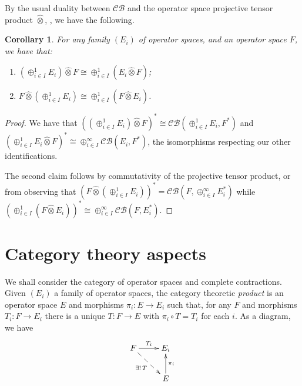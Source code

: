 \documentclass[a4paper,11pt]{article}
\theoremstyle{plain}
\newtheorem{corollary}[proposition]{Corollary}
\theoremstyle{definition}
\newcommand{\mc}[1]{\mathcal{#1}}
\newcommand{\proten}{\widehat\otimes}
\begin{document}
By the usual duality between $\mc{CB}$ and the operator space projective tensor product
$\proten$, \cite[Chapter~7]{er}, we have the following.

\begin{corollary}
For any family $(E_i)$ of operator spaces, and an operator space $F$, we have that:
\begin{enumerate}
\item $(\oplus_{i\in I}^1 E_i) \proten F \cong \oplus_{i\in I}^1 (E_i\proten F)$;
\item $F \proten (\oplus_{i\in I}^1 E_i) \cong \oplus_{i\in I}^1 (F\proten E_i)$.
\end{enumerate}
\end{corollary}
\begin{proof}
We have that $((\oplus_{i\in I}^1 E_i) \proten F)^* \cong \mc{CB}(\oplus_{i\in I}^1 E_i, F^*)$
and $(\oplus_{i\in I}^1 E_i\proten F)^* \cong \oplus_{i\in I}^\infty \mc{CB}(E_i,F^*)$,
the isomorphisms respecting our other identifications.

The second claim follows by commutativity of the projective tensor product, or from
observing that $(F \proten (\oplus_{i\in I}^1 E_i))^* = \mc{CB}(F, \oplus_{i\in I}^\infty
E_i^*)$ while $(\oplus_{i\in I}^1 (F\proten E_i))^* \cong \oplus_{i\in I}^\infty
\mc{CB}(F,E_i^*)$.
\end{proof}


\section{Category theory aspects}\label{sec:cat}

We shall consider the category of operator spaces and complete contractions.
Given $(E_i)$ a family of operator spaces, the category theoretic \emph{product} is an
operator space $E$ and morphisms $\pi_i:E\rightarrow E_i$ such that, for any $F$ and morphisms
$T_i:F\rightarrow E_i$ there is a unique $T:F\rightarrow E$ with $\pi_i\circ T = T_i$ for
each $i$.  As a diagram, we have
\[ \xymatrix{ F \ar[r]^-{T_i} \ar@{-->}[rd]_-{\exists!\, T} & E_i \\
& E \ar[u]_-{\pi_i} } \]
\end{document}

